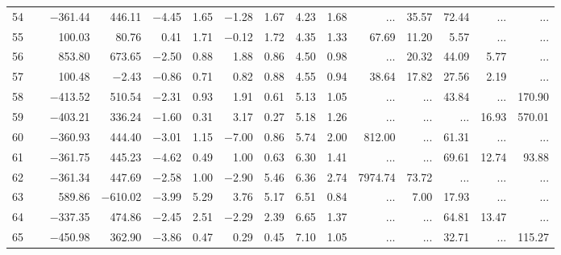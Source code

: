 \begin{table*}[p]
{\begin{tabular}{l@{ }r@{ \ }rr@{ \ }rr@{ \ }rrrr@{ \ }r@{ \ }r@{ \ }r@{ \ }r}
 54   \ \dotfill \  &  $-$361.44 &    446.11 &  $-$4.45 &   1.65 &  $-$1.28 &   1.67
 &    4.23 &   1.68
  &    ...     &       35.57 &       72.44 &    ...     &    ...       \\     
 55   \ \dotfill \  &    100.03 &     80.76 &    0.41 &   1.71 &  $-$0.12 &   1.72
 &    4.35 &   1.33
  &       67.69 &       11.20 &        5.57 &    ...     &    ...       \\     
 56   \ \dotfill \  &    853.80 &    673.65 &  $-$2.50 &   0.88 &    1.88 &   0.86
 &    4.50 &   0.98
  &    ...     &       20.32 &       44.09 &        5.77 &    ...       \\     
 57   \ \dotfill \  &    100.48 &    $-$2.43 &  $-$0.86 &   0.71 &    0.82 &   0.88
 &    4.55 &   0.94
  &       38.64 &       17.82 &       27.56 &        2.19 &    ...       \\     
 58   \ \dotfill \  &  $-$413.52 &    510.54 &  $-$2.31 &   0.93 &    1.91 &   0.61
 &    5.13 &   1.05
  &    ...     &    ...     &       43.84 &    ...     &      170.90   \\     
 59   \ \dotfill \  &  $-$403.21 &    336.24 &  $-$1.60 &   0.31 &    3.17 &   0.27
 &    5.18 &   1.26
  &    ...     &    ...     &    ...     &       16.93 &      570.01   \\     
 60   \ \dotfill \  &  $-$360.93 &    444.40 &  $-$3.01 &   1.15 &  $-$7.00 &   0.86
 &    5.74 &   2.00
  &      812.00 &    ...     &       61.31 &    ...     &    ...       \\     
 61   \ \dotfill \  &  $-$361.75 &    445.23 &  $-$4.62 &   0.49 &    1.00 &   0.63
 &    6.30 &   1.41
  &    ...     &    ...     &       69.61 &       12.74 &       93.88   \\     
 62   \ \dotfill \  &  $-$361.34 &    447.69 &  $-$2.58 &   1.00 &  $-$2.90 &   5.46
 &    6.36 &   2.74
  &     7974.74 &       73.72 &    ...     &    ...     &    ...       \\     
 63   \ \dotfill \  &    589.86 &  $-$610.02 &  $-$3.99 &   5.29 &    3.76 &   5.17
 &    6.51 &   0.84
  &    ...     &        7.00 &       17.93 &    ...     &    ...       \\     
 64   \ \dotfill \  &  $-$337.35 &    474.86 &  $-$2.45 &   2.51 &  $-$2.29 &   2.39
 &    6.65 &   1.37
  &    ...     &    ...     &       64.81 &       13.47 &    ...       \\     
 65   \ \dotfill \  &  $-$450.98 &    362.90 &  $-$3.86 &   0.47 &    0.29 &   0.45
 &    7.10 &   1.05
  &    ...     &    ...     &       32.71 &    ...     &      115.27   \\     

\end{tabular}}
\end{table*}
